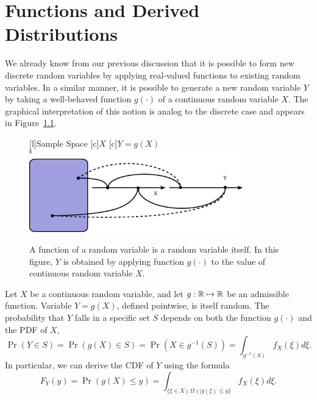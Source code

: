 \chapter{Functions and Derived Distributions}

We already know from our previous discussion that it is possible to form new discrete random variables by applying real-valued functions to existing random variables.
In a similar manner, it is possible to generate a new random variable $Y$ by taking a well-behaved function $g(\cdot)$ of a continuous random variable $X$.
The graphical interpretation of this notion is analog to the discrete case and appears in Figure~\ref{figure:FunctionContinuousRV}.

\begin{figure}[ht]
\begin{center}
\begin{psfrags}
[l]{Sample Space}
[c]{$X$}
[c]{$Y = g(X)$}
\includegraphics[width=9.26cm]{Figures/9Chapter/fcn-cnt}
\end{psfrags}
\caption{A function of a random variable is a random variable itself.
In this figure, $Y$ is obtained by applying function $g(\cdot)$ to the value of continuous random variable $X$.}
\label{figure:FunctionContinuousRV}
\end{center}
\end{figure}

Let $X$ be a continuous random variable, and let $g: \mathbb{R} \mapsto \mathbb{R}$ be an admissible function.
Variable $Y = g(X)$, defined pointwise, is itself random.
The probability that $Y$ falls in a specific set $S$ depends on both the function $g(\cdot)$ and the PDF of $X$,
\begin{equation*}
\Pr (Y \in S) = \Pr (g(X) \in S) 
= \Pr \left( X \in g^{-1}(S) \right)
= \int_{g^{-1} (S)} f_X (\xi) d\xi .
\end{equation*}
In particular, we can derive the CDF of $Y$ using the formula
\begin{equation} \label{equation:DerivedCDF}
F_Y(y) = \Pr (g(X) \leq y)
= \int_{ \{ \xi \in X(\Omega) | g(\xi) \leq y \} } f_X(\xi) d\xi .
\end{equation}

